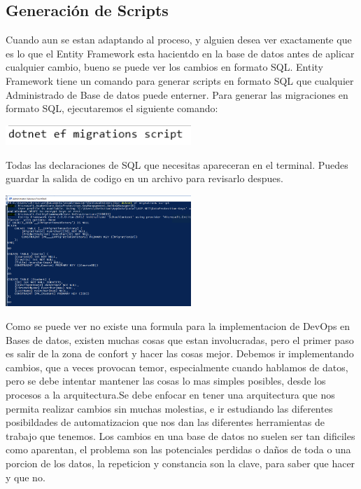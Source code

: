 \documentclass[twoside,twocolumn]{article}
\begin{document}
\subsection{Generación de Scripts}
Cuando aun se estan adaptando al proceso, y alguien desea ver exactamente que es lo que el Entity Framework esta hacientdo en la base de datos antes de aplicar cualquier cambio, bueno se puede ver los cambios en formato SQL. Entity Framework tiene un comando para generar scripts en formato SQL que cualquier Administrado de Base de datos puede enterner.
Para generar las migraciones en formato SQL, ejecutaremos el siguiente comando:
 \begin{center}
	\includegraphics[width=7cm]{./Imagenes/codigo3} 
	\end{center}
Todas las declaraciones de SQL que necesitas apareceran en el terminal. Puedes guardar la salida de codigo en un archivo para revisarlo despues.
 \begin{center}
	\includegraphics[width=7cm]{./Imagenes/scripts} 
	\end{center}
Como se puede ver no existe una formula para la implementacion de DevOps en Bases de datos, existen muchas cosas que estan involucradas, pero el primer paso es salir de la zona de confort y hacer las cosas mejor. Debemos ir implementando cambios, que a veces provocan temor, especialmente cuando hablamos de datos, pero se debe intentar mantener las cosas lo mas simples posibles, desde los procesos a la arquitectura.Se debe enfocar en tener una arquitectura que nos permita realizar cambios sin muchas molestias, e ir estudiando las diferentes posibildades de automatizacion que nos dan las diferentes herramientas de trabajo que tenemos. Los cambios en una base de datos no suelen ser tan dificiles como aparentan, el problema son las potenciales perdidas o daños de toda o una porcion de los datos, la repeticion y constancia son la clave, para saber que hacer y que no. 
\end{document}
